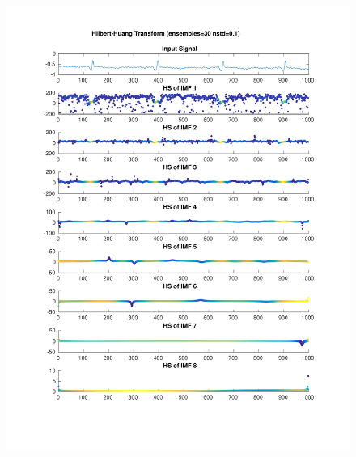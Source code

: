 \documentclass{beamer}
\begin{document}
\begin{frame}
\begin{columns}
\begin{figure}
\includegraphics[width=\textwidth]{fig/112l2_hht_ensemble.pdf}
\end{figure}
\end{columns}
\end{frame}


\end{document}
